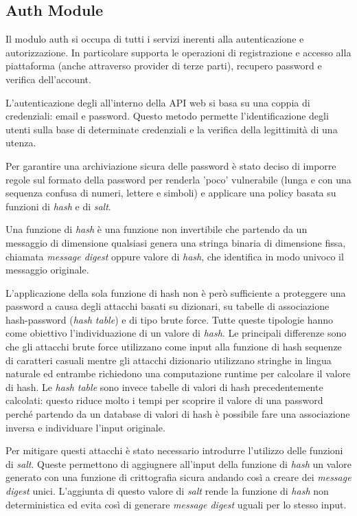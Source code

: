 \subsection{Auth Module}
Il modulo auth si occupa di tutti i servizi inerenti alla autenticazione e autorizzazione.
In particolare supporta le operazioni di registrazione e accesso alla piattaforma (anche attraverso provider di terze parti), recupero password e verifica dell'account.

L'autenticazione degli all'interno della API web si basa su una coppia di credenziali: email e password.
Questo metodo permette l'identificazione degli utenti sulla base di determinate credenziali e la
verifica della legittimità di una utenza.

Per garantire una archiviazione sicura delle password è stato deciso di imporre regole sul formato della password per renderla 'poco' vulnerabile (lunga e con una sequenza confusa di numeri, lettere e simboli)
e applicare una policy basata su funzioni di \textit{hash} e di \textit{salt}.

Una funzione di \textit{hash} è una funzione non invertibile che partendo da un messaggio di dimensione qualsiasi genera una stringa
binaria di dimensione fissa, chiamata \textit{message digest} oppure valore di \textit{hash}, che identifica in modo univoco il messaggio originale.

L'applicazione della sola funzione di hash non è però sufficiente a proteggere una password a causa degli attacchi basati su dizionari, su tabelle di associazione
hash-password (\textit{hash table}) e di tipo brute force. Tutte queste tipologie hanno come obiettivo l'individuazione di un valore di \textit{hash}.
Le principali differenze sono che gli attacchi brute force utilizzano come input alla funzione di hash sequenze di caratteri casuali mentre gli attacchi dizionario utilizzano
stringhe in lingua naturale ed entrambe richiedono una computazione runtime per calcolare il valore di hash.
Le \textit{hash table} sono invece tabelle di valori di hash precedentemente calcolati: questo riduce molto i tempi per scoprire il valore di una password
perché partendo da un database di valori di hash è possibile fare una associazione inversa e individuare l'input originale.

Per mitigare questi attacchi è stato necessario introdurre l'utilizzo delle funzioni di \textit{salt}.
Queste permettono di aggiugnere all'input della funzione di \textit{hash} un valore generato con una funzione di crittografia sicura andando così a creare dei \textit{message digest} unici.
L'aggiunta di questo valore di \textit{salt} rende la funzione di \textit{hash} non deterministica ed
evita così di generare \textit{message digest} uguali per lo stesso input.

